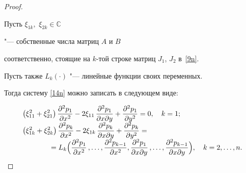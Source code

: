 \begin{proof}
\begin{equation}
\end{equation}





Пусть $\xi_{1k},$ $\xi_{2k}\in\mathbb{C}$

"--- собственные числа матриц  $A$ и $B$

соответственно, стоящие на $k$-той строке  матриц $J_1$, $J_2$ в~\eqref{9n}. 

Пусть также  $L_k(\cdot)$ "--- линейные функции своих переменных.

Тогда систему  \eqref{14n} можно записать в следующем виде:

\begin{equation}

\begin{array}{l}

\displaystyle 

 \bigr(\xi_{11}^2+\xi_{21}^2\bigr)\,\frac{\partial^2 p_1}{\partial x^2}-

2\xi_{11}\,\frac{\partial^2 p_1}{\partial x\partial y}+

\frac{\partial^2 p_1}{\partial y^2}=0,\quad k=1;

\\

\displaystyle 

 \bigr(\xi_{1k}^2+\xi_{2k}^2\bigr)\,\frac{\partial^2 p_k}{\partial x^2}-

2\xi_{1k}\,\frac{\partial^2 p_k}{\partial x\partial y}+

\frac{\partial^2 p_k}{\partial y^2}=

\\

\displaystyle 

\hspace{1.4cm}

=L_k\Bigl(\frac{\partial^2 p_1}{\partial x^2}\,,\ldots,

\frac{\partial^2 p_{\scriptstyle k-1}}{\partial x^2},

\frac{\partial^2 p_1}{\partial x\partial y}\,,\ldots,

\frac{\partial^2 p_{\scriptstyle k-1}}{\partial x\partial y}\Bigr),

\quad k=2,\ldots,n.

\end{array}

\label{15n}

\end{equation}




\end{proof}
